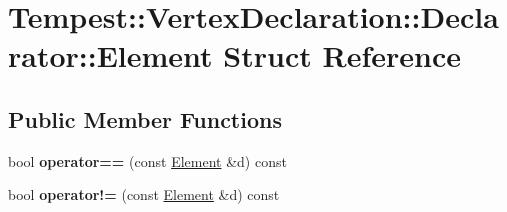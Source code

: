 \hypertarget{struct_tempest_1_1_vertex_declaration_1_1_declarator_1_1_element}{\section{Tempest\+:\+:Vertex\+Declaration\+:\+:Declarator\+:\+:Element Struct Reference}
\label{struct_tempest_1_1_vertex_declaration_1_1_declarator_1_1_element}
}
\subsection*{Public Member Functions}
\begin{DoxyCompactItemize}
\item 
\hypertarget{struct_tempest_1_1_vertex_declaration_1_1_declarator_1_1_element_a877a619dbfc5d8d43a4d6dd33f597888}{bool {\bfseries operator==} (const \hyperlink{struct_tempest_1_1_vertex_declaration_1_1_declarator_1_1_element}{Element} \&d) const }\label{struct_tempest_1_1_vertex_declaration_1_1_declarator_1_1_element_a877a619dbfc5d8d43a4d6dd33f597888}

\item 
\hypertarget{struct_tempest_1_1_vertex_declaration_1_1_declarator_1_1_element_a90bc4d77caecbe7a8c64349097445aea}{bool {\bfseries operator!=} (const \hyperlink{struct_tempest_1_1_vertex_declaration_1_1_declarator_1_1_element}{Element} \&d) const }\label{struct_tempest_1_1_vertex_declaration_1_1_declarator_1_1_element_a90bc4d77caecbe7a8c64349097445aea}

\end{DoxyCompactItemize}
